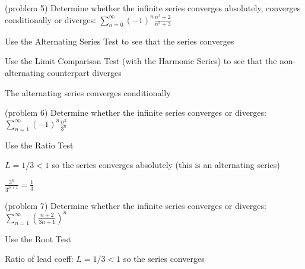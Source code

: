 \documentclass[handout]{ximera}
\begin{document}
\begin{problem}(problem 5)
Determine whether the infinite series converges absolutely, converges conditionally or diverges: $\displaystyle \sum_{n=0}^\infty (-1)^n \frac{n^2 + 2}{n^3 + 3}$

\begin{hint}
Use the Alternating Series Test to see that the series converges
\end{hint}

\begin{hint}
Use the Limit Comparison Test (with the Harmonic Series) to see that the 
non-alternating counterpart diverges
\end{hint}

\begin{hint}
The alternating series converges conditionally
\end{hint}

\end{problem}

\begin{problem}(problem 6)
Determine whether the infinite series converges or diverges: 
$\displaystyle \sum_{n=1}^\infty (-1)^n\frac{n^2}{3^n}$

\begin{hint}
Use the Ratio Test
\end{hint}

\begin{hint}
$L = 1/3 < 1$ so the series converges absolutely (this is an alternating series)
\end{hint}

\begin{hint}
$\frac{3^n}{3^{n+1}} = \frac13$
\end{hint}

\end{problem}


\begin{problem}(problem 7)
Determine whether the infinite series converges or diverges: 
$\displaystyle \sum_{n=1}^\infty \left(\frac{n+ 2}{3n+1}\right)^n$

\begin{hint}
Use the Root Test
\end{hint}

\begin{hint}
Ratio of lead coeff: $L = 1/3 < 1$ so the series converges
\end{hint}

\end{problem}
\end{document}
